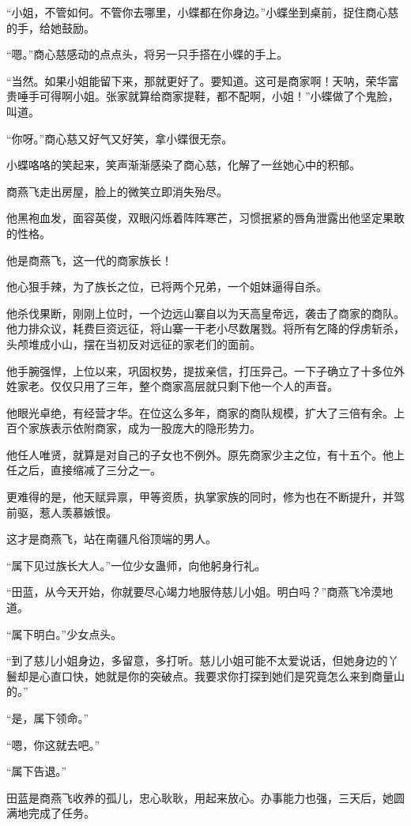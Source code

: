 \begin{this_body}
“小姐，不管如何。不管你去哪里，小蝶都在你身边。”小蝶坐到桌前，捉住商心慈的手，给她鼓励。

“嗯。”商心慈感动的点点头，将另一只手搭在小蝶的手上。

“当然。如果小姐能留下来，那就更好了。要知道。这可是商家啊！天呐，荣华富贵唾手可得啊小姐。张家就算给商家提鞋，都不配啊，小姐！”小蝶做了个鬼脸，叫道。

“你呀。”商心慈又好气又好笑，拿小蝶很无奈。

小蝶咯咯的笑起来，笑声渐渐感染了商心慈，化解了一丝她心中的积郁。

商燕飞走出房屋，脸上的微笑立即消失殆尽。

他黑袍血发，面容英俊，双眼闪烁着阵阵寒芒，习惯抿紧的唇角泄露出他坚定果敢的性格。

他是商燕飞，这一代的商家族长！

他心狠手辣，为了族长之位，已将两个兄弟，一个姐妹逼得自杀。

他杀伐果断，刚刚上位时，一个边远山寨自以为天高皇帝远，袭击了商家的商队。他力排众议，耗费巨资远征，将山寨一干老小尽数屠戮。将所有乞降的俘虏斩杀，头颅堆成小山，摆在当初反对远征的家老们的面前。

他手腕强悍，上位以来，巩固权势，提拔亲信，打压异己。一下子确立了十多位外姓家老。仅仅只用了三年，整个商家高层就只剩下他一个人的声音。

他眼光卓绝，有经营才华。在位这么多年，商家的商队规模，扩大了三倍有余。上百个家族表示依附商家，成为一股庞大的隐形势力。

他任人唯贤，就算是对自己的子女也不例外。原先商家少主之位，有十五个。他上任之后，直接缩减了三分之一。

更难得的是，他天赋异禀，甲等资质，执掌家族的同时，修为也在不断提升，并驾前驱，惹人羡慕嫉恨。

这才是商燕飞，站在南疆凡俗顶端的男人。

“属下见过族长大人。”一位少女蛊师，向他躬身行礼。

“田蓝，从今天开始，你就要尽心竭力地服侍慈儿小姐。明白吗？”商燕飞冷漠地道。

“属下明白。”少女点头。

“到了慈儿小姐身边，多留意，多打听。慈儿小姐可能不太爱说话，但她身边的丫鬟却是心直口快，她就是你的突破点。我要求你打探到她们是究竟怎么来到商量山的。”

“是，属下领命。”

“嗯，你这就去吧。”

“属下告退。”

田蓝是商燕飞收养的孤儿，忠心耿耿，用起来放心。办事能力也强，三天后，她圆满地完成了任务。


\end{this_body}

